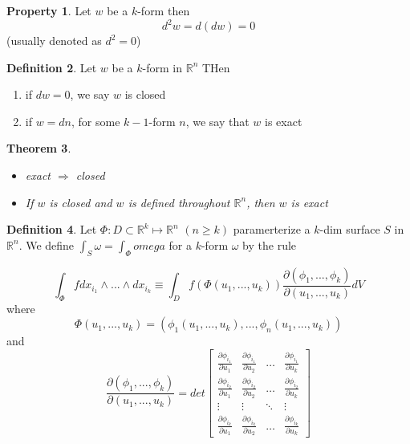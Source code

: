\documentclass[12pt]{article}
\theoremstyle{plain}
\newtheorem{theorem}{Theorem}[section]
\theoremstyle{definition}
\newtheorem{definition}[theorem]{Definition}
\newtheorem{property}[theorem]{Property}
\begin{document}
\begin{property}
    Let $w$ be a $k$-form then
    $$d^2 w = d(dw) = 0$$
    (usually denoted as $d^2 = 0$)
\end{property}

\begin{definition}
    Let $w$ be a $k$-form in $\mathbb{R}^n$ THen
    \begin{enumerate}
        \item{if $dw = 0$, we say $w$ is closed}
        \item{if $w=dn$, for some $k-1$-form $n$, we say that $w$ is exact}
    \end{enumerate}
\end{definition}

\begin{theorem}
    \begin{itemize}
        \item{exact $\Longrightarrow$ closed}
        \item{If $w$ is closed and $w$ is defined throughout $\mathbb{R}^n$, then $w$ is exact}
    \end{itemize}
\end{theorem}

\begin{definition}
    Let $\Phi : D \subset \mathbb{R}^k \mapsto\mathbb{R}^n$ $(n \geq  k)$ paramerterize a $k$-dim surface $S$ in $\mathbb{R}^n$. We define $\int_S \omega = \int_\Phi omega$ for a $k$-form $\omega$ by the rule

    $$\int_\Phi f dx_{i_1} \wedge ... \wedge dx_{i_k} \equiv \int_D f(\Phi (u_1,..., u_k)) \frac{\partial (\phi_1,..., \phi_k)}{\partial (u_1,..., u_k)} dV$$
    where
    $$\Phi (u_1,..., u_k) = (\phi_1 (u_1,..., u_k), ..., \phi_n (u_1,..., u_k))$$
    and
    $$\frac{\partial (\phi_1,..., \phi_k)}{\partial (u_1,..., u_k)} = det\begin{bmatrix}
    \frac{\partial \phi_{i_1}}{\partial u_1} & \frac{\partial \phi_{i_1}}{\partial u_2} & \dots  & \frac{\partial \phi_{i_1}}{\partial u_k} \\
    \frac{\partial \phi_{i_2}}{\partial u_1} & \frac{\partial \phi_{i_2}}{\partial u_2} & \dots  & \frac{\partial \phi_{i_2}}{\partial u_k} \\
    \vdots & \vdots & \ddots & \vdots \\
    \frac{\partial \phi_{i_k}}{\partial u_1} & \frac{\partial \phi_{i_k}}{\partial u_2} & \dots  & \frac{\partial \phi_{i_k}}{\partial u_k}
\end{bmatrix}$$
\end{definition}
\end{document}
